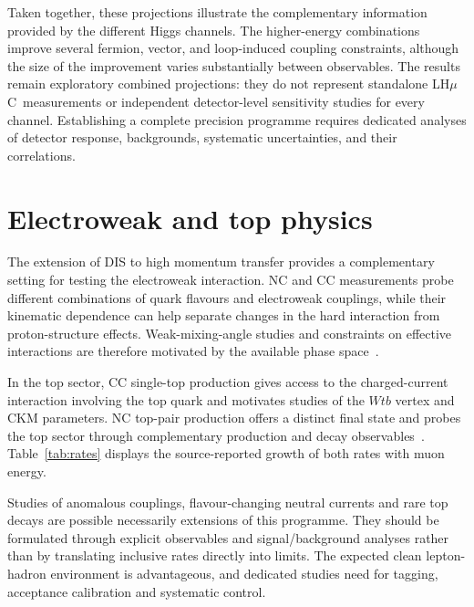 \documentclass[a4paper,11pt]{article}
\newcommand{\lhmuc}{LH$\mu$C}
\begin{document}
Taken together, these projections illustrate the complementary
information provided by the different Higgs channels.
The higher-energy combinations improve several fermion,
vector, and loop-induced coupling constraints, although the
size of the improvement varies substantially between
observables. The results remain exploratory combined
projections: they do not represent standalone \lhmuc\
measurements or independent detector-level sensitivity
studies for every channel. Establishing a complete precision
programme requires dedicated analyses of detector response,
backgrounds, systematic uncertainties, and their correlations.





\section{Electroweak and top physics}\label{sec:ewtop}

The extension of DIS to high momentum transfer provides a complementary 
setting for testing the electroweak 
interaction. NC and CC measurements probe different combinations of quark 
flavours and electroweak couplings, 
while their kinematic dependence can help separate changes in the hard 
interaction from proton-structure effects. 
Weak-mixing-angle studies and constraints on effective interactions are 
therefore motivated by the 
available phase space~\cite{HELP4CERN,LHeC:2020van}. 

In the top sector, CC single-top production gives access to the charged-current interaction 
involving the top quark and motivates studies of the $Wtb$ vertex and CKM parameters. 
NC top-pair production offers a distinct final state and probes the top sector through 
complementary production and decay observables~\cite{HELP4CERN}. 
Table~\ref{tab:rates} displays the source-reported growth of both rates with muon energy. 

Studies of anomalous couplings, flavour-changing neutral currents and rare 
top decays are possible necessarily extensions of 
this programme. They should be formulated through explicit observables and 
signal/background analyses 
rather than by translating inclusive rates directly into limits. The expected 
clean lepton-hadron environment is 
advantageous, and dedicated studies need for tagging, acceptance calibration 
and systematic control. 
\end{document}
